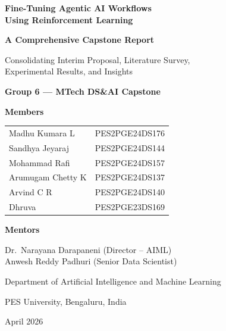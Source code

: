 \documentclass[12pt,a4paper]{report}
\theoremstyle{definition}
\newcommand{\reportdate}{April 2026}
\begin{document}
\hypersetup{pageanchor=false}
\begin{titlepage}
\thispagestyle{empty}
\centering
\vspace*{0.8cm}

{\Huge\bfseries Fine-Tuning Agentic AI Workflows\\Using Reinforcement Learning\par}
\vspace{0.3cm}
{\Large\bfseries A Comprehensive Capstone Report\par}
\vspace{0.2cm}
{\large Consolidating Interim Proposal, Literature Survey,\\Experimental Results, and Insights\par}

\vspace{0.8cm}
{\Large\bfseries Group 6 --- MTech DS\&AI Capstone\par}

\vspace{0.6cm}
{\large\textbf{Members}\par}
\vspace{0.2cm}
\begin{tabular}{@{}ll@{}}
    Madhu Kumara L & PES2PGE24DS176 \\
    Sandhya Jeyaraj & PES2PGE24DS144 \\
    Mohammad Rafi & PES2PGE24DS157 \\
    Arumugam Chetty K & PES2PGE24DS137 \\
    Arvind C R & PES2PGE24DS140 \\
    Dhruva & PES2PGE23DS169 \\
\end{tabular}

\vspace{0.6cm}
{\large\textbf{Mentors}\par}
\vspace{0.2cm}
Dr.\ Narayana Darapaneni (Director -- AIML)\\
Anwesh Reddy Padhuri (Senior Data Scientist)

\vfill
{\large Department of Artificial Intelligence and Machine Learning\par}
{\large PES University, Bengaluru, India\par}
\vspace{0.4cm}
{\large \reportdate\par}
\end{titlepage}
\hypersetup{pageanchor=true}
\end{document}
